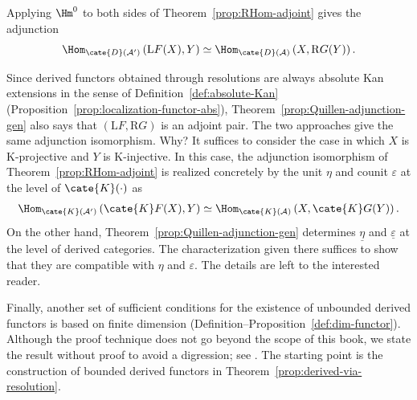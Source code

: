 \begin{remark}
	Applying $\Hm^0$ to both sides of Theorem~\ref{prop:RHom-adjoint} gives the
	adjunction
	\[ \Hom_{\cate{D}(\mathcal{A'})}\left(\mathrm{L}F(X), Y\right) \simeq \Hom_{\cate{D}(\mathcal{A})}\left(X, \mathrm{R}G(Y) \right). \]

	Since derived functors obtained through resolutions are always absolute Kan
	extensions in the sense of Definition~\ref{def:absolute-Kan}
	(Proposition~\ref{prop:localization-functor-abs}),
	Theorem~\ref{prop:Quillen-adjunction-gen} also says that
	$(\mathrm{L}F,\mathrm{R}G)$ is an adjoint pair. The two approaches give the
	same adjunction isomorphism. Why? It suffices to consider the case in which
	$X$ is K-projective and $Y$ is K-injective. In this case, the adjunction
	isomorphism of Theorem~\ref{prop:RHom-adjoint} is realized concretely by the
	unit $\eta$ and counit $\varepsilon$ at the level of $\cate{K}(\cdot)$ as
	\begin{align*}
		\Hom_{\cate{K}(\mathcal{A}')}\left( \cate{K}F(X), Y\right) \simeq \Hom_{\cate{K}(\mathcal{A})}\left( X, \cate{K}G(Y) \right).
	\end{align*}
	On the other hand, Theorem~\ref{prop:Quillen-adjunction-gen} determines
	$\underline{\eta}$ and $\underline{\varepsilon}$ at the level of derived
	categories. The characterization given there suffices to show that they are
	compatible with $\eta$ and $\varepsilon$. The details are left to the
	interested reader.
\end{remark}

Finally, another set of sufficient conditions for the existence of unbounded
derived functors is based on finite dimension
(Definition--Proposition~\ref{def:dim-functor}). Although the proof technique
does not go beyond the scope of this book, we state the result without proof
to avoid a digression; see {\cite[Tags 07K6, 07K7]{stacks}}. The starting
point is the construction of bounded derived functors in
Theorem~\ref{prop:derived-via-resolution}.

